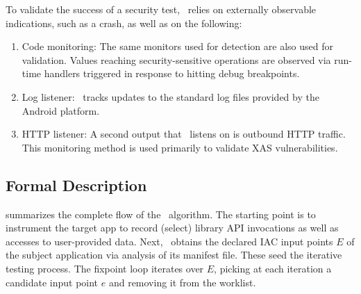 To validate the success of a security test, \Tool\ relies on externally observable indications, such as a crash, as well as on the following: 
\begin{enumerate}
	\item Code monitoring: The same monitors used for detection are also used for validation.
	Values reaching security-sensitive operations are observed via run-time handlers 
	triggered in response to hitting debug breakpoints.
	\item Log listener: \Tool\ tracks updates to the standard log files provided by the Android platform. 
	\item HTTP listener: A second output that \Tool\ listens on is outbound HTTP traffic. This monitoring method is used primarily to validate XAS vulnerabilities.
\end{enumerate} 

\subsection{Formal Description}

 summarizes the complete flow of the \Tool\ algorithm. The starting point is to instrument the target app to record (select) library API invocations as well as accesses to user-provided data. Next, \Tool\ obtains the declared IAC input points $E$ of the subject application via analysis of its manifest file. These seed the iterative testing process. The fixpoint loop iterates over $E$, picking at each iteration a candidate input point $e$ and removing it from the worklist.


